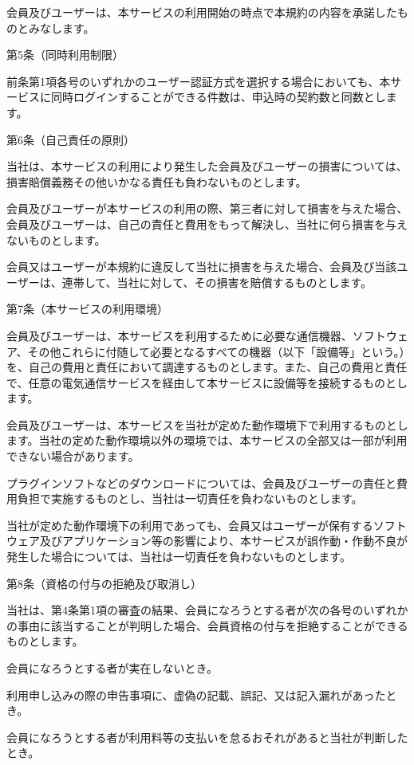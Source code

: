     会員及びユーザーは、本サービスの利用開始の時点で本規約の内容を承諾したものとみなします。

第5条（同時利用制限）

    前条第1項各号のいずれかのユーザー認証方式を選択する場合においても、本サービスに同時ログインすることができる件数は、申込時の契約数と同数とします。

第6条（自己責任の原則）

    当社は、本サービスの利用により発生した会員及びユーザーの損害については、損害賠償義務その他いかなる責任も負わないものとします。

    会員及びユーザーが本サービスの利用の際、第三者に対して損害を与えた場合、会員及びユーザーは、自己の責任と費用をもって解決し、当社に何ら損害を与えないものとします。

    会員又はユーザーが本規約に違反して当社に損害を与えた場合、会員及び当該ユーザーは、連帯して、当社に対して、その損害を賠償するものとします。

第7条（本サービスの利用環境）

    会員及びユーザーは、本サービスを利用するために必要な通信機器、ソフトウェア、その他これらに付随して必要となるすべての機器（以下「設備等」という。）を、自己の費用と責任において調達するものとします。また、自己の費用と責任で、任意の電気通信サービスを経由して本サービスに設備等を接続するものとします。

    会員及びユーザーは、本サービスを当社が定めた動作環境下で利用するものとします。当社の定めた動作環境以外の環境では、本サービスの全部又は一部が利用できない場合があります。

    プラグインソフトなどのダウンロードについては、会員及びユーザーの責任と費用負担で実施するものとし、当社は一切責任を負わないものとします。

    当社が定めた動作環境下の利用であっても、会員又はユーザーが保有するソフトウェア及びアプリケーション等の影響により、本サービスが誤作動・作動不良が発生した場合については、当社は一切責任を負わないものとします。

第8条（資格の付与の拒絶及び取消し）

    当社は、第4条第1項の審査の結果、会員になろうとする者が次の各号のいずれかの事由に該当することが判明した場合、会員資格の付与を拒絶することができるものとします。

        会員になろうとする者が実在しないとき。

        利用申し込みの際の申告事項に、虚偽の記載、誤記、又は記入漏れがあったとき。

        会員になろうとする者が利用料等の支払いを怠るおそれがあると当社が判断したとき。

